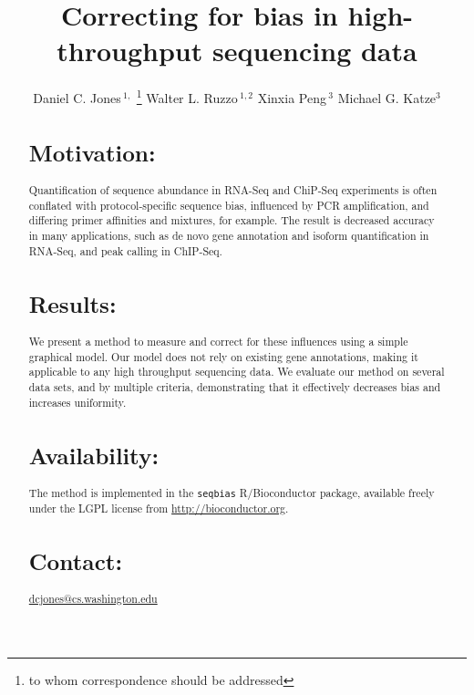\documentclass{bioinfo}
\begin{document}

\title{Correcting for bias in high-throughput sequencing data}
\author[Jones \textit{et~al}]
{Daniel C. Jones\,$^{1,}$
\footnote{to whom correspondence should be addressed}\hspace{0.5em}
Walter L. Ruzzo\,$^{1,2}$
Xinxia Peng\,$^{3}$
Michael G. Katze$^{3}$
}


\address{
$^{1}$Department of Computer Science and Engineering, University of
Washington, Seattle, WA 98195-2350, USA\\
$^{2}$Fred Hutchinson Cancer Research Center, Seattle, WA 98109, USA\\
$^{3}$Department of Microbiology, University of Washington, Seattle, WA
98195-7242, USA}


\maketitle

\begin{abstract}

\section{Motivation:}
Quantification of sequence abundance in RNA-Seq and ChiP-Seq experiments is
often conflated with protocol-specific sequence bias, influenced by PCR
amplification, and differing primer affinities and mixtures, for example.  The
result is decreased accuracy in many applications, such as de novo gene
annotation and isoform quantification in RNA-Seq, and peak calling in
ChIP-Seq.


\section{Results:}
We present a method to measure and correct for these influences using a simple
graphical model. Our model does not rely on existing gene annotations, making it
applicable to any high throughput sequencing data. We evaluate our method on
several data sets, and by multiple criteria, demonstrating that it effectively
decreases bias and increases uniformity.


\section{Availability:}
The method is implemented in the \texttt{seqbias} R/Bioconductor package,
available freely under the LGPL license from
\href{http://bioconductor.org}{http://bioconductor.org}.


\section{Contact:}
\href{dcjones@cs.washington.edu}{dcjones@cs.washington.edu}

\end{abstract}
\end{document}
